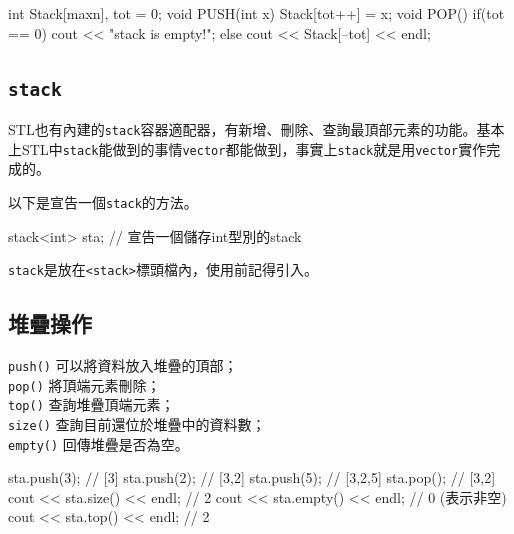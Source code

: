 \documentclass[main.tex]{subfiles}
\begin{document}
\begin{C++}
int Stack[maxn], tot = 0;
void PUSH(int x) {
    Stack[tot++] = x;
}
void POP(){
    if(tot == 0)
        cout << "stack is empty!\n";
    else
        cout << Stack[--tot] << endl;
}
\end{C++}
\subsection{\texttt{stack}}
STL也有內建的\texttt{stack}容器適配器，有新增、刪除、查詢最頂部元素的功能。基本上STL中\texttt{stack}能做到的事情\texttt{vector}都能做到，事實上\texttt{stack}就是用\texttt{vector}實作完成的。\\


以下是宣告一個\texttt{stack}的方法。
\begin{C++}
stack<int> sta; // 宣告一個儲存int型別的stack
\end{C++}
\indent \texttt{stack}是放在\texttt{<stack>}標頭檔內，使用前記得引入。

\subsection{堆疊操作}
\texttt{push()} 可以將資料放入堆疊的頂部；\\
\indent\texttt{pop()} 將頂端元素刪除；\\
\indent\texttt{top()} 查詢堆疊頂端元素；\\
\indent\texttt{size()} 查詢目前還位於堆疊中的資料數；\\
\indent\texttt{empty()} 回傳堆疊是否為空。
\begin{C++}
sta.push(3); // [3]
sta.push(2); // [3,2]
sta.push(5); // [3,2,5]
sta.pop(); // [3,2]
cout << sta.size() << endl; // 2
cout << sta.empty() << endl; // 0 (表示非空)
cout << sta.top() << endl; // 2
\end{C++}
\end{document}
